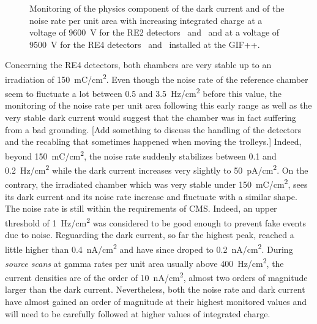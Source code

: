 \begin{figure}[H]
\begin{subfigure}{0.5\linewidth}
        	\caption{\label{fig:GIFpp-Dark-rate-mon:D}}
    	\end{subfigure}
		\caption{\label{fig:GIFpp-Dark-rate-mon} Monitoring of the physics component of the dark current and of the noise rate per unit area with increasing integrated charge at a voltage of \SI{9600}{V} for the RE2 detectors~ and~ and at a voltage of \SI{9500}{V} for the RE4 detectors~ and~ installed at the GIF++.}
	\end{figure}
	
	Concerning the RE4 detectors, both chambers are very stable up to an irradiation of \SI{150}{mC/cm^2}. Even though the noise rate of the reference chamber seem to fluctuate a lot between 0.5 and \SI{3.5}{Hz/cm^2} before this value, the monitoring of the noise rate per unit area following this early range as well as the very stable dark current would suggest that the chamber was in fact suffering from a bad grounding. [Add something to discuss the handling of the detectors and the recabling that sometimes happened when moving the trolleys.] Indeed, beyond \SI{150}{mC/cm^2}, the noise rate suddenly stabilizes between 0.1 and \SI{0.2}{Hz/cm^2} while the dark current increases very slightly to \SI{50}{pA/cm^2}. On the contrary, the irradiated chamber which was very stable under \SI{150}{mC/cm^2}, sees its dark current and its noise rate increase and fluctuate with a similar shape. The noise rate is still within the requirements of CMS. Indeed, an upper threshold of \SI{1}{Hz/cm^2} was considered to be good enough to prevent fake events due to noise. Reguarding the dark current, so far the highest peak, reached a little higher than \SI{0.4}{nA/cm^2} and have since droped to \SI{0.2}{nA/cm^2}. During \textit{source scans} at gamma rates per unit area usually above \SI{400}{Hz/cm^2}, the current densities are of the order of \SI{10}{nA/cm^2}, almost two orders of magnitude larger than the dark current. Nevertheless, both the noise rate and dark current have almost gained an order of magnitude at their highest monitored values and will need to be carefully followed at higher values of integrated charge.

